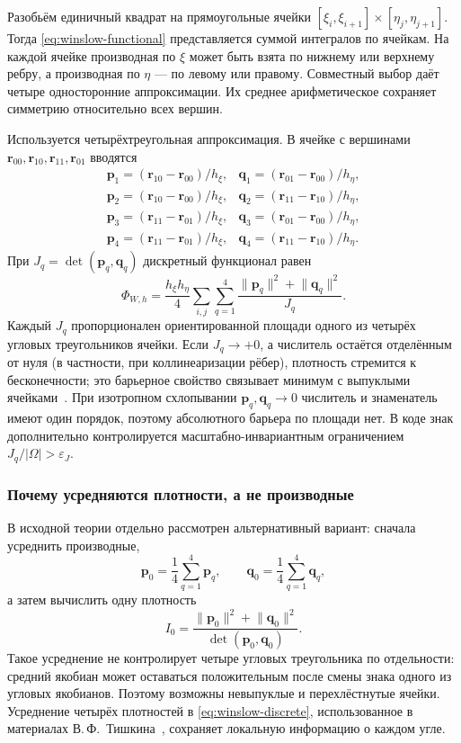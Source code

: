 \documentclass[11pt,a4paper]{article}
\newcommand{\vect}[1]{\boldsymbol{#1}}
\begin{document}
Разобьём единичный квадрат на прямоугольные ячейки
\([\xi_i,\xi_{i+1}]\times[\eta_j,\eta_{j+1}]\). Тогда
\eqref{eq:winslow-functional} представляется суммой интегралов по
ячейкам. На каждой ячейке производная по \(\xi\) может быть взята по
нижнему или верхнему ребру, а производная по \(\eta\) --- по левому или
правому. Совместный выбор даёт четыре односторонние аппроксимации.
Их среднее арифметическое сохраняет симметрию относительно всех вершин.

Используется четырёхтреугольная аппроксимация. В ячейке с вершинами
\(\vect r_{00},\vect r_{10},\vect r_{11},\vect r_{01}\) вводятся
\[
\begin{array}{ll}
\vect p_1=(\vect r_{10}-\vect r_{00})/h_\xi,&
\vect q_1=(\vect r_{01}-\vect r_{00})/h_\eta,\\
\vect p_2=(\vect r_{10}-\vect r_{00})/h_\xi,&
\vect q_2=(\vect r_{11}-\vect r_{10})/h_\eta,\\
\vect p_3=(\vect r_{11}-\vect r_{01})/h_\xi,&
\vect q_3=(\vect r_{01}-\vect r_{00})/h_\eta,\\
\vect p_4=(\vect r_{11}-\vect r_{01})/h_\xi,&
\vect q_4=(\vect r_{11}-\vect r_{10})/h_\eta .
\end{array}
\]
При \(J_q=\det(\vect p_q,\vect q_q)\) дискретный функционал равен
\begin{equation}
\Phi_{W,h}=\frac{h_\xi h_\eta}{4}
\sum_{i,j}\sum_{q=1}^{4}
\frac{\lVert\vect p_q\rVert^2+\lVert\vect q_q\rVert^2}{J_q}.
\label{eq:winslow-discrete}
\end{equation}
Каждый \(J_q\) пропорционален ориентированной площади одного из четырёх
угловых треугольников ячейки. Если \(J_q\to+0\), а числитель остаётся
отделённым от нуля (в частности, при коллинеаризации рёбер), плотность
стремится к бесконечности; это барьерное свойство связывает минимум с
выпуклыми ячейками~\cite{ivanenko1988}. При изотропном схлопывании
\(\vect p_q,\vect q_q\to0\) числитель и знаменатель имеют один порядок,
поэтому абсолютного барьера по площади нет. В коде знак дополнительно
контролируется масштабно-инвариантным ограничением
\(J_q/|\Omega|>\varepsilon_J\).

\subsubsection{Почему усредняются плотности, а не производные}

В исходной теории отдельно рассмотрен альтернативный вариант:
сначала усреднить производные,
\[
\vect p_0=\frac14\sum_{q=1}^4\vect p_q,\qquad
\vect q_0=\frac14\sum_{q=1}^4\vect q_q,
\]
а затем вычислить одну плотность
\begin{equation}
I_0=\frac{\lVert\vect p_0\rVert^2+\lVert\vect q_0\rVert^2}
{\det(\vect p_0,\vect q_0)}.
\label{eq:averaged-derivatives}
\end{equation}
Такое усреднение не контролирует четыре угловых треугольника по
отдельности: средний якобиан может оставаться положительным после смены
знака одного из угловых якобианов. Поэтому возможны невыпуклые и
перехлёстнутые ячейки. Усреднение четырёх плотностей в
\eqref{eq:winslow-discrete}, использованное в материалах
В.\,Ф.~Тишкина~\cite{tishkin2024}, сохраняет локальную информацию о
каждом угле.
\end{document}

